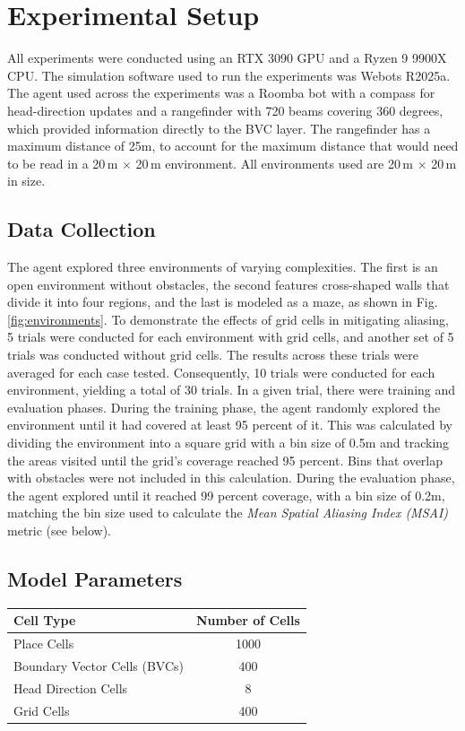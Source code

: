 \documentclass[conference]{IEEEtran}
\begin{document}
\section{Experimental Setup}
\label{sec:exp_setup}
All experiments were conducted using an RTX 3090 GPU and a Ryzen 9 9900X CPU. The simulation software used to run the experiments was Webots R2025a. The agent used across the experiments was a Roomba bot with a compass for head-direction updates and a rangefinder with 720 beams covering 360 degrees, which provided information directly to the BVC layer. The rangefinder has a maximum distance of 25m, to account for the maximum distance that would need to be read in a 20\,m $\times$ 20\,m environment. All environments used are 20\,m $\times$ 20\,m in size. 

\subsection{Data Collection}
\label{sec:data_coll}
The agent explored three environments of varying complexities. The first is an open environment without obstacles, the second features cross-shaped walls that divide it into four regions, and the last is modeled as a maze, as shown in Fig. \ref{fig:environments}. To demonstrate the effects of grid cells in mitigating aliasing, 5 trials were conducted for each environment with grid cells, and another set of 5 trials was conducted without grid cells. The results across these trials were averaged for each case tested. Consequently, 10 trials were conducted for each environment, yielding a total of 30 trials. In a given trial, there were training and evaluation phases. During the training phase, the agent randomly explored the environment until it had covered at least 95 percent of it. This was calculated by dividing the environment into a square grid with a bin size of 0.5m and tracking the areas visited until the grid's coverage reached 95 percent. Bins that overlap with obstacles were not included in this calculation. During the evaluation phase, the agent explored until it reached 99 percent coverage, with a bin size of 0.2m, matching the bin size used to calculate the \textit{Mean Spatial Aliasing Index (MSAI)} metric (see below). 

\subsection{Model Parameters}
\label{sec:model_params}
\begin{center}
\label{tab:cell_counts}

\begin{tabular}{l c}
\hline
\textbf{Cell Type} & \textbf{Number of Cells} \\
\hline
Place Cells & 1000 \\
Boundary Vector Cells (BVCs) & 400 \\
Head Direction Cells & 8 \\
Grid Cells & 400 \\
\hline
\end{tabular}
\end{center}
\end{document}
